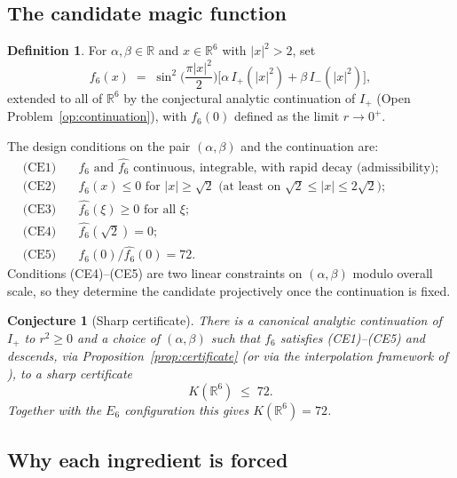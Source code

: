 \documentclass[11pt,reqno]{amsart}
\theoremstyle{plain}
\newtheorem{conjecture}[theorem]{Conjecture}
\theoremstyle{definition}
\newtheorem{definition}[theorem]{Definition}
\theoremstyle{remark}
\newcommand{\R}{\mathbb{R}}
\newcommand{\Ip}{I_{+}}
\newcommand{\Imm}{I_{-}}
\newcommand{\fhat}[1]{\widehat{#1}}
\begin{document}
\subsection{The candidate magic function}\label{subsec:f6}

\begin{definition}\label{def:f6}
For $\alpha,\beta\in\R$ and $x\in\R^6$ with $|x|^2>2$, set
\[
f_6(x)\;=\;\sin^2\!\Big(\frac{\pi|x|^2}{2}\Big)
\Big[\alpha\,\Ip(|x|^2)+\beta\,\Imm(|x|^2)\Big],
\]
extended to all of $\R^6$ by the conjectural analytic continuation of
$\Ip$ (Open Problem~\ref{op:continuation}), with $f_6(0)$ defined as
the limit $r\to0^+$.
\end{definition}

The design conditions on the pair $(\alpha,\beta)$ and the
continuation are:
\begin{equation}\label{eq:CE-design}
\begin{aligned}
\text{(CE1)}&\quad f_6 \text{ and } \fhat{f_6} \text{ continuous,
integrable, with rapid decay (admissibility);}\\
\text{(CE2)}&\quad f_6(x)\le0 \text{ for } |x|\ge\sqrt2
\text{ (at least on } \sqrt2\le|x|\le2\sqrt2\text{);}\\
\text{(CE3)}&\quad \fhat{f_6}(\xi)\ge0 \text{ for all } \xi;\\
\text{(CE4)}&\quad \fhat{f_6}(\sqrt2)=0;\\
\text{(CE5)}&\quad f_6(0)/\fhat{f_6}(0)=72 .
\end{aligned}
\end{equation}
Conditions (CE4)--(CE5) are two linear constraints on
$(\alpha,\beta)$ modulo overall scale, so they determine the candidate
projectively once the continuation is fixed.

\begin{conjecture}[Sharp certificate]\label{conj:certificate}
There is a canonical analytic continuation of $\Ip$ to $r^2\ge0$ and a
choice of $(\alpha,\beta)$ such that $f_6$ satisfies
\textup{(CE1)--(CE5)} and descends, via
Proposition~\ref{prop:certificate} (or via the interpolation framework
of \cite{CKMRV2022}), to a sharp certificate
\[
K(\R^6)\;\le\;72 .
\]
Together with the $E_6$ configuration this gives $K(\R^6)=72$.
\end{conjecture}

\subsection{Why each ingredient is forced}\label{subsec:forced}
\end{document}
